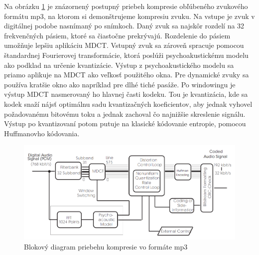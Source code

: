 Na obrázku \ref{fig:mp3_flow_diagram} je znázornený postupný priebeh
kompresie obľúbeného zvukového formátu mp3, na ktorom si demonštrujeme
kompresiu zvuku. Na vstupe je zvuk v digitálnej podobe nasnímaný po
snímkoch. Daný zvuk sa najskôr rozdelí na 32 frekvenčných pásiem,
ktoré sa čiastočne prekrývajú. Rozdelenie do pásiem umožňuje lepšiu
aplikáciu MDCT. Vstupný zvuk sa zároveň spracuje pomocou štandardnej
Fourierovej transformácie, ktorá poslúži psychoakustickému modelu ako
podklad na určenie kvantizácie. Výstup z psychoakustického modelu sa
priamo aplikuje na MDCT ako veľkosť použitého okna. Pre dynamické
zvuky sa používa kratšie okno ako napríklad pre dlhé tiché pasáže.
Po windowingu je výstup MDCT nasmerovaný ho hlavnej časti kodeku.
Tou je kvantizácia, kde sa kodek snaží nájsť optimálnu sadu
kvantizačných koeficientov, aby jednak vyhovel požadovanému bitovému
toku a jednak zachoval čo najnižšie skreslenie signálu. Výstup po
kvantizovaní potom putuje na klasické kódovanie entropie, pomocou
Huffmanovho kódovania.

\begin{figure}[htp]
    \centering
    \includegraphics{obrazky/informatika/audio/mp3_flow_diagram}
    \caption{Blokový diagram priebehu kompresie vo formáte mp3}
    \label{fig:mp3_flow_diagram}
\end{figure}
